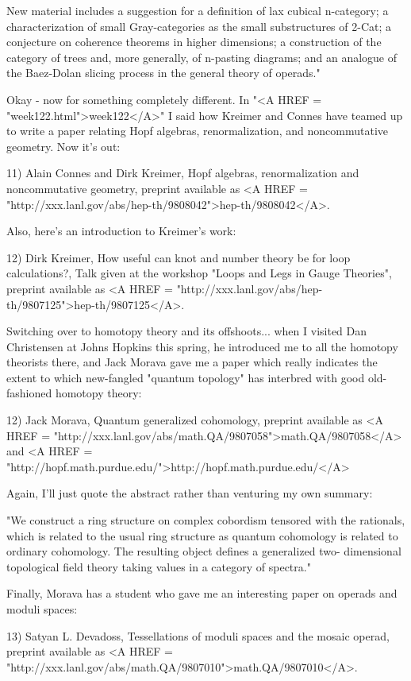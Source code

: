 New material includes a suggestion for a definition of lax cubical
n-category; a characterization of small Gray-categories as the small
substructures of 2-Cat; a conjecture on coherence theorems in higher
dimensions; a construction of the category of trees and, more
generally, of n-pasting diagrams; and an analogue of the Baez-Dolan
slicing process in the general theory of operads."

Okay - now for something completely different.  In "<A HREF = "week122.html">week122</A>" I said how
Kreimer and Connes have teamed up to write a paper relating Hopf
algebras, renormalization, and noncommutative geometry.  Now it's out:

11) Alain Connes and Dirk Kreimer, Hopf algebras, renormalization and 
noncommutative geometry, preprint available as <A HREF = "http://xxx.lanl.gov/abs/hep-th/9808042">hep-th/9808042</A>.

Also, here's an introduction to Kreimer's work:

12) Dirk Kreimer, How useful can knot and number theory be for loop 
calculations?, Talk given at the workshop "Loops and Legs in Gauge 
Theories", preprint available as <A HREF = "http://xxx.lanl.gov/abs/hep-th/9807125">hep-th/9807125</A>.


 Switching over to homotopy theory and its offshoots... when I
visited Dan Christensen at Johns Hopkins this spring, he introduced me
to all the homotopy theorists there, and Jack Morava gave me a paper
which really indicates the extent to which new-fangled "quantum
topology" has interbred with good old- fashioned homotopy theory:

12) Jack Morava, Quantum generalized cohomology, preprint available
as 
<A HREF = "http://xxx.lanl.gov/abs/math.QA/9807058">math.QA/9807058</A>
and <A HREF = "http://hopf.math.purdue.edu/">http://hopf.math.purdue.edu/</A>

Again, I'll just quote the abstract rather than venturing my own
summary:

"We construct a ring structure on complex cobordism tensored with the
rationals, which is related to the usual ring structure as quantum
cohomology is related to ordinary cohomology. The resulting object
defines a generalized two- dimensional topological field theory taking
values in a category of spectra."

Finally, Morava has a student who gave me an interesting paper on 
operads and moduli spaces:

13) Satyan L. Devadoss, Tessellations of moduli spaces and the mosaic operad, 
preprint available as 
<A HREF = "http://xxx.lanl.gov/abs/math.QA/9807010">math.QA/9807010</A>.

